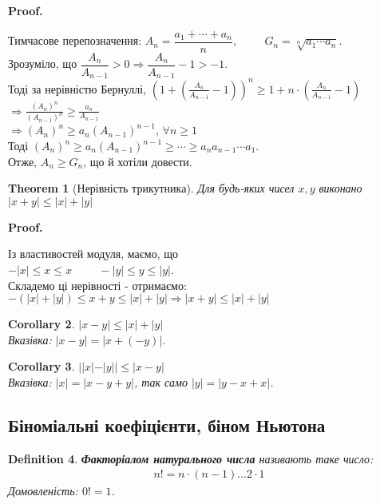 \documentclass[a4paper, 14pt]{article}
\makeatletter
\def\qed{$\blacksquare$}
\theoremstyle{theoremdd}
\newtheorem{theorem}{Theorem}[subsection]
\theoremstyle{theoremdd}
\newtheorem{definition}[theorem]{Definition}
\theoremstyle{theoremdd}
\theoremstyle{theoremdd}
\theoremstyle{theoremdd}
\theoremstyle{theoremdd}
\theoremstyle{theoremdd}
\theoremstyle{theoremdd}
\newtheorem{corollary}[theorem]{Corollary}
\renewenvironment{proof}[1][Proof.\\]{\par
\pushQED{\hfill \qed}%
\normalfont \topsep6\p@\@plus6\p@\relax
\trivlist
\item\relax
{\bfseries
#1\@addpunct{.}}\hspace\labelsep\ignorespaces
}{%
\popQED\endtrivlist\@endpefalse
}
\makeatother
\begin{document}
	\begin{proof}
	Тимчасове перепозначення: $A_n = \dfrac{a_1+\cdots+a_n}{n}, \hspace{1cm} G_n = \sqrt[n]{a_1 \cdots a_n}$.\\
	Зрозуміло, що $\dfrac{A_n}{A_{n-1}} > 0 \Rightarrow \dfrac{A_n}{A_{n-1}}-1>-1$. \\ Тоді за нерівністю Бернуллі,
	$\displaystyle \left(1+ \left(\frac{A_n}{A_{n-1}} -1 \right) \right)^n \geq 1 + n \cdot \left(\frac{A_n}{A_{n-1}} -1 \right)$
	$\Rightarrow \displaystyle \frac{(A_n)^n}{(A_{n-1})^n} \geq \frac{a_n}{A_{n-1}}$\\
	$\Rightarrow \displaystyle (A_n)^n \geq a_n (A_{n-1})^{n-1}$, $\forall n \geq 1$ \\ Тоді $(A_n)^n \geq a_n (A_{n-1})^{n-1} \geq \cdots \geq a_n a_{n-1} \cdots a_1$. \\ Отже, $A_n \geq G_n$, що й хотіли довести.
	\end{proof}
	
	\begin{theorem}[Нерівність трикутника]
	Для будь-яких чисел $x,y$ виконано $|x+y| \leq |x| + |y|$
	\end{theorem}
	
	\begin{proof}
	Із властивостей модуля, маємо, що\\
	$-|x| \leq x \leq x \hspace{1cm} -|y| \leq y \leq |y|$.\\
	Складемо ці нерівності - отримаємо:\\
	$-(|x|+|y|) \leq x+y \leq |x|+|y| \Rightarrow |x+y| \leq |x| + |y|$
	\end{proof}
	
	\begin{corollary}
	$|x-y| \leq |x| + |y|$\\
	\textit{Вказівка: $|x-y| = |x+(-y)|$.}
	\end{corollary}
	
	\begin{corollary}
	$||x|-|y|| \leq |x-y|$\\
	\textit{Вказівка: $|x| = |x-y+y|$, так само $|y| = |y-x+x|$.}
	\end{corollary}
	
	\subsection*{Біноміальні коефіцієнти, біном Ньютона}
	\begin{definition}
	\textbf{Факторіалом натурального числа} називають таке число:
	\begin{align*}
	n! = n \cdot (n-1) \dots 2 \cdot 1
	\end{align*}
	Домовленість: $0! = 1$.
	\end{definition}
	
\end{document}
